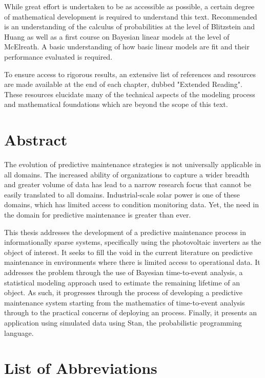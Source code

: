 While great effort is undertaken to be as accessible as possible, a certain degree of mathematical development is required to understand this text. Recommended is an understanding of the calculus of probabilities at the level of Blitzstein and Huang\cite{Blitzstein2014} as well as a first course on Bayesian linear models at the level of McElreath\cite{McElreath2016}. A basic understanding of how basic linear models are fit and their performance evaluated is required.

To ensure access to rigorous results, an extensive list of references and resources are made available at the end of each chapter, dubbed "Extended Reading". These resources elucidate many of the technical aspects of the modeling process and mathematical foundations which are beyond the scope of this text.

\newpage

\section*{Abstract}


The evolution of predictive maintenance strategies is not universally applicable in all domains. The increased ability of organizations to capture a wider breadth and greater volume of data has lead to a narrow research focus that cannot be easily translated to all domains. Industrial-scale solar power is one of these domains, which has limited access to condition monitoring data. Yet, the need in the domain for predictive maintenance is greater than ever.

This thesis addresses the development of a predictive maintenance process in informationally sparse systems, specifically using the photovoltaic inverters as the object of interest. It seeks to fill the void in the current literature on predictive maintenance in environments where there is limited access to operational data. It addresses the problem through the use of Bayesian time-to-event analysis, a statistical modeling approach used to estimate the remaining lifetime of an object. As such, it progresses through the process of developing a predictive maintenance system starting from the mathematics of time-to-event analysis through to the practical concerns of deploying an process. Finally, it presents an application using simulated data using Stan, the probabilistic programming language.


\newpage

\section*{List of Abbreviations}

